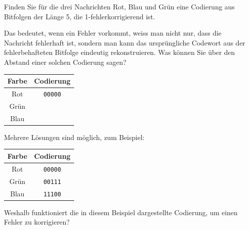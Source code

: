 \begin{myexercise}\label{ex:fehlerkorrektur}
    Finden Sie für die drei Nachrichten Rot, Blau und Grün eine Codierung aus Bitfolgen der Länge 5, die 1-fehlerkorrigierend ist.

    Das bedeutet, wenn ein Fehler vorkommt, weiss man nicht nur, dass die Nachricht fehlerhaft ist, sondern man kann das ursprüngliche Codewort aus der fehlerbehafteten Bitfolge eindeutig rekonstruieren. Was können Sie über den Abstand einer solchen Codierung sagen?

    \begin{table}[H]
        \centering
        \begin{tabular}{cc}
            \textbf{Farbe} & \textbf{Codierung} \\\midrule
            Rot            & \texttt{00000}     \\\midrule
            Grün           &                    \\\midrule
            Blau           &                    \\
        \end{tabular}
    \end{table}
    \begin{myanswer}
        Mehrere Lösungen sind möglich, zum Beispiel:

        \begin{table}[H]
            \centering
            \begin{tabular}{cc}
                \textbf{Farbe} & \textbf{Codierung} \\\midrule
                Rot            & \texttt{00000}     \\\midrule
                Grün           & \texttt{00111}     \\\midrule
                Blau           & \texttt{11100}     \\
            \end{tabular}
        \end{table}
        Weshalb funktioniert die in diesem Beispiel dargestellte Codierung, um einen Fehler zu korrigieren?


\end{myanswer}
\end{myexercise}
